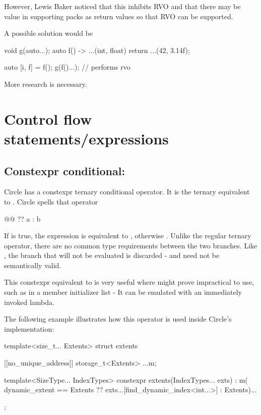 \documentclass{wg21}
\begin{document}
However, Lewis Baker noticed that this inhibits RVO and that there may be value in supporting packs as return values so that RVO can be supported.

A possible solution would be

\begin{colorblock}
void g(auto...);
auto f() -> ...(int, float) {
    return ...(42, 3.14f);
}

auto [i, f] = f();
g(f()...); // performs rvo
\end{colorblock}


More research is necessary.

\section{Control flow statements/expressions}
\label{sec:constexprternary}


\subsection{Constexpr conditional: }

Circle has a constexpr ternary conditional operator.
It is the ternary equivalent to .
Circle spells that operator 

\begin{colorblock}
@@ ?? a : b
\end{colorblock}

If  is true, the expression is equivalent to , otherwise .
Unlike the regular ternary operator, there are no common type requirements between the two branches.
Like , the branch that will not be evaluated is discarded - and need not be semantically valid.

This constexpr equivalent to  is very useful where  might prove impractical to use, such as
in a member initializer list - It can be emulated with an immediately invoked lambda.

The following example illustrates how this operator is used inside Circle's  implementation:

\begin{colorblock}
template<size_t... Extents>
struct extents {
    [[no_unique_address]] storage_t<Extents> ...m;

    template<SizeType... IndexTypes>
    constexpr extents(IndexTypes... exts) :
        m( dynamic_extent == Extents ??  exts...[find_dynamic_index<int...>] : Extents)... { }
};
\end{colorblock}
\end{document}
